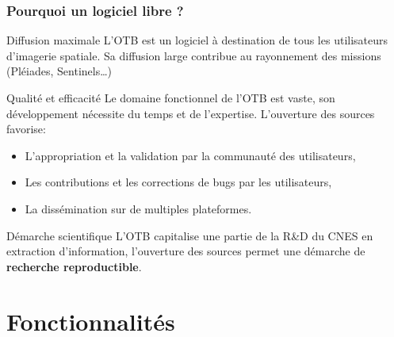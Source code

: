 \documentclass[8pt]{beamer}
\begin{document}
\begin{frame}
\frametitle{Pourquoi un logiciel libre ?}

\begin{block}{Diffusion maximale}
L'OTB est un logiciel à destination de tous les utilisateurs d'imagerie
spatiale. Sa diffusion large contribue au rayonnement des missions (Pléiades, Sentinels\ldots)
\end{block}

\begin{block}{Qualité et efficacité}
Le domaine fonctionnel de l'OTB est vaste, son développement nécessite du temps
et de l'expertise. L'ouverture des sources favorise:
\begin{itemize}
\item L'appropriation et la validation par la communauté des utilisateurs,
\item Les contributions et les corrections de bugs par les utilisateurs,
\item La dissémination sur de multiples plateformes.
\end{itemize}
\end{block}

\begin{block}{Démarche scientifique}
L'OTB capitalise une partie de la R\&D du CNES en extraction d'information, l'ouverture des sources permet une démarche de \textbf{recherche reproductible}.
\end{block}

\end{frame}

\section{Fonctionnalités}


\end{document}

